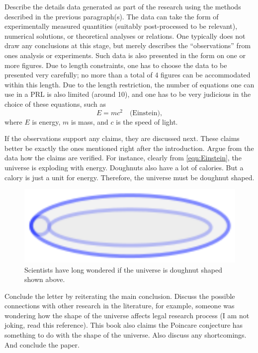 \documentclass[twocolumn,prl]{revtex4-1}
\begin{document}
Describe the details data generated as part of the research using the methods described in the previous paragraph(s). The data can take the form of experimentally measured quantities (suitably post-processed to be relevant), numerical solutions, or theoretical analyses or relations. One typically does not draw any conclusions at this stage, but merely describes the ``observations'' from ones analysis or experiments. Such data is also presented in the form on one or more figures. Due to length constraints, one has to choose the data to be presented very carefully; no more than a total of 4 figures can be accommodated within this length. Due to the length restriction, the number of equations one can use in a PRL is also limited (around 10), and one has to be very judicious in the choice of these equations, such as
\begin{equation}
E = m c^2 \quad \text{(Einstein)}, \label{eqn:Einstein}
\end{equation}
where $E$ is energy, $m$ is mass, and $c$ is the speed of light.

If the observations support any claims, they are discussed next. These claims better be exactly the ones mentioned right after the introduction. Argue from the data how the claims are verified. For instance, clearly from \eqref{eqn:Einstein}, the universe is exploding with energy. Doughnuts also have a lot of calories. But a calory is just a unit for energy. Therefore, the universe must be doughnut shaped.
\begin{figure}[htb]
\includegraphics{Figures/Schematic_Doughnut}
\caption{Scientists have long wondered if the universe is doughnut shaped shown above.}
\label{fig:Schematic_Doughnut}
\end{figure}


Conclude the letter by reiterating the main conclusion. Discuss the possible connections with other research in the literature, for example, someone was wondering how the shape of the universe affects legal research process\cite{mills2003shape} (I am not joking, read this reference). This book\cite{oshea2009poincare} also claims the Poincare conjecture has something to do with the shape of the universe. Also discuss any shortcomings. And conclude the paper. 

\end{document}
